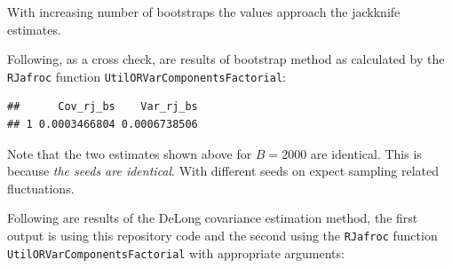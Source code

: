 \documentclass[
]{book}
\newenvironment{Shaded}{\begin{snugshade}}{\end{snugshade}}
\newcommand{\DataTypeTok}[1]{\textcolor[rgb]{0.13,0.29,0.53}{#1}}
\newcommand{\DecValTok}[1]{\textcolor[rgb]{0.00,0.00,0.81}{#1}}
\newcommand{\KeywordTok}[1]{\textcolor[rgb]{0.13,0.29,0.53}{\textbf{#1}}}
\newcommand{\NormalTok}[1]{#1}
\newcommand{\OperatorTok}[1]{\textcolor[rgb]{0.81,0.36,0.00}{\textbf{#1}}}
\newcommand{\StringTok}[1]{\textcolor[rgb]{0.31,0.60,0.02}{#1}}
\begin{document}
With increasing number of bootstraps the values approach the jackknife estimates.

Following, as a cross check, are results of bootstrap method as calculated by the \texttt{RJafroc} function \texttt{UtilORVarComponentsFactorial}:

\begin{Shaded}
\end{Shaded}

\begin{verbatim}
##      Cov_rj_bs    Var_rj_bs
## 1 0.0003466804 0.0006738506
\end{verbatim}

Note that the two estimates shown above for \(B = 2000\) are identical. This is because \emph{the seeds are identical}. With different seeds on expect sampling related fluctuations.

Following are results of the DeLong covariance estimation method, the first output is using this repository code and the second using the \texttt{RJafroc} function \texttt{UtilORVarComponentsFactorial} with appropriate arguments:

\begin{Shaded}
\end{Shaded}
\end{document}

